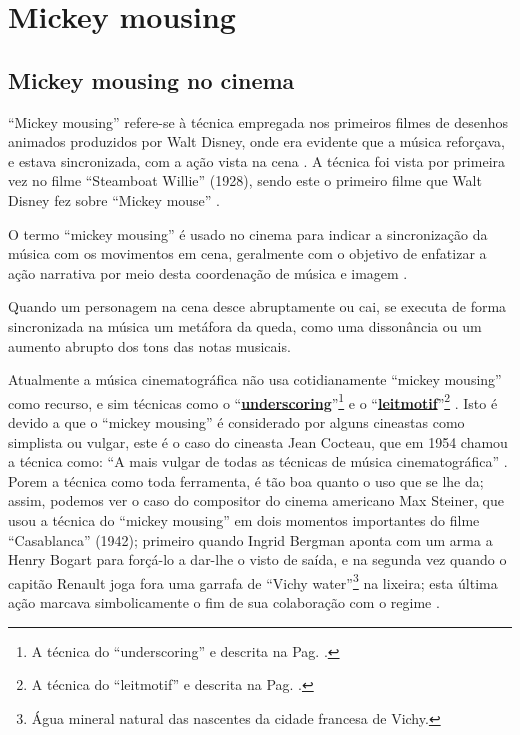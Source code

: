 

\section{Mickey mousing}
\label{sec:mikeymousing}


\subsection{Mickey mousing no cinema}

``Mickey mousing'' refere-se à técnica empregada nos primeiros filmes de desenhos animados produzidos por Walt Disney,
onde era evidente que a música reforçava, e estava sincronizada, 
com a ação vista na cena \cite{butterworth2011dance} \cite[pp. 62]{kalinak2010film}.
A técnica foi vista por primeira vez no filme ``Steamboat Willie'' (1928),
sendo este o primeiro filme que Walt Disney fez sobre ``Mickey mouse'' \cite[pp. 37]{wegele2014max}.

O termo ``mickey mousing'' é usado no cinema para indicar a sincronização da música com os movimentos em cena,
geralmente com o objetivo de enfatizar a ação narrativa por meio desta coordenação de música e imagem
  \cite{butterworth2011dance} \cite[pp. 62]{kalinak2010film}.


\begin{example}
Quando um personagem na cena desce abruptamente ou cai, 
se executa  de forma sincronizada na música um metáfora da queda,
como uma dissonância ou um aumento abrupto dos tons das notas musicais.
\end{example}

Atualmente a música cinematográfica não usa cotidianamente ``mickey mousing'' como recurso,
e sim técnicas como o ``\hyperref[ref:Underscoring]{\textbf{underscoring}}''\footnote{
A técnica do ``underscoring'' e descrita na Pag. \pageref{ref:Underscoring}.} e 
o ``\hyperref[subsec:LeitmotivCine]{\textbf{leitmotif}}''\footnote{
A técnica do ``leitmotif'' e descrita na Pag. \pageref{subsec:LeitmotivCine}.} \cite[pp. 37]{wegele2014max}.
Isto é devido a que o ``mickey mousing'' é considerado por alguns cineastas como simplista ou vulgar,
este é o caso do cineasta Jean Cocteau, que em 1954 chamou a técnica como: ``A mais vulgar de todas as técnicas de música cinematográfica'' \cite[pp. 37]{wegele2014max}.
Porem a técnica como toda ferramenta, é tão boa quanto o uso que se lhe da;
assim, podemos ver o caso do compositor do cinema americano Max Steiner,
que usou a técnica do ``mickey mousing'' em dois momentos importantes do filme ``Casablanca'' (1942);
primeiro quando Ingrid Bergman aponta com um arma a Henry Bogart para forçá-lo a dar-lhe o visto de saída,
e na segunda vez quando o capitão Renault joga fora uma garrafa de 
``Vichy water''\footnote{Água mineral natural das nascentes da cidade francesa de Vichy.} na lixeira;
esta última ação marcava simbolicamente o fim de sua colaboração com o regime \cite[pp. 38]{wegele2014max}.



